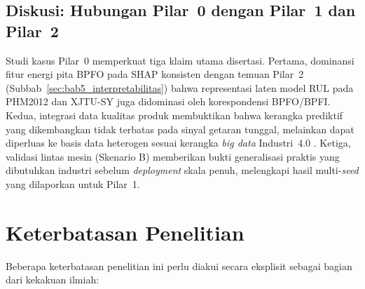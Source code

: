 
\subsection{Diskusi: Hubungan Pilar~0 dengan Pilar~1 dan Pilar~2}
\label{subsec:bab5_kls_diskusi}

Studi kasus Pilar~0 memperkuat tiga klaim utama disertasi.
Pertama, dominansi fitur energi pita BPFO pada SHAP konsisten dengan
temuan Pilar~2 (Subbab~\ref{sec:bab5_interpretabilitas}) bahwa representasi
laten model RUL pada PHM2012 dan XJTU-SY juga didominasi oleh korespondensi
BPFO/BPFI.
Kedua, integrasi data kualitas produk membuktikan bahwa kerangka prediktif
yang dikembangkan tidak terbatas pada sinyal getaran tunggal, melainkan dapat
diperluas ke basis data heterogen sesuai kerangka \emph{big data} Industri~4.0
.
Ketiga, validasi lintas mesin (Skenario B) memberikan bukti generalisasi
praktis yang dibutuhkan industri sebelum \emph{deployment} skala penuh,
melengkapi hasil multi-\emph{seed} yang dilaporkan untuk Pilar~1.

\section{Keterbatasan Penelitian}
\label{sec:bab5_keterbatasan}

Beberapa keterbatasan penelitian ini perlu diakui secara eksplisit sebagai
bagian dari kekakuan ilmiah:

